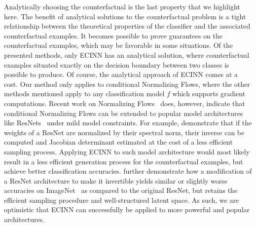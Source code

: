 \documentclass[11pt,a4paper,twoside,openright,final]{memoir}
\begin{document}
Analytically choosing the counterfactual is the last property that we highlight here.
The benefit of analytical solutions to the counterfactual problem is a tight relationship between the theoretical properties of the classifier and the associated counterfactual examples.
It becomes possible to prove guarantees on the counterfactual examples, which may be favorable in some situations. 
Of the presented methods, only ECINN has an analytical solution, where counterfactual examples situated exactly on the decision boundary between two classes is possible to produce.
Of course, the analytical approach of ECINN comes at a cost.
% 
Our method only applies to conditional Normalizing Flows, where the other methods mentioned apply to any classification model $f$ which supports gradient computations.
Recent work on Normalizing Flows~\cite{iresnet, ffjord, expl-inn} does, however, indicate that conditional Normalizing Flows can be extended to popular model architectures like ResNets~\cite{resnet} under mild model constraints. 
For example, \cite{iresnet} demonstrate that if the weights of a ResNet are normalized by their spectral norm, their inverse can be computed and Jacobian determinant estimated at the cost of a less efficient sampling process.
Applying ECINN to such model architecture would most likely result in a less efficient generation process for the counterfactual examples, but achieve better classification accuracies.
\citet{expl-inn} further demonstrate how a modification of a ResNet architecture to make it invertible yields similar or slightly worse accuracies on ImageNet~\cite{imagenet} as compared to the original ResNet, but retains the efficient sampling procedure and well-structured latent space.
As such, we are optimistic that ECINN can successfully be applied to more powerful and popular architectures.
    
\end{document}
